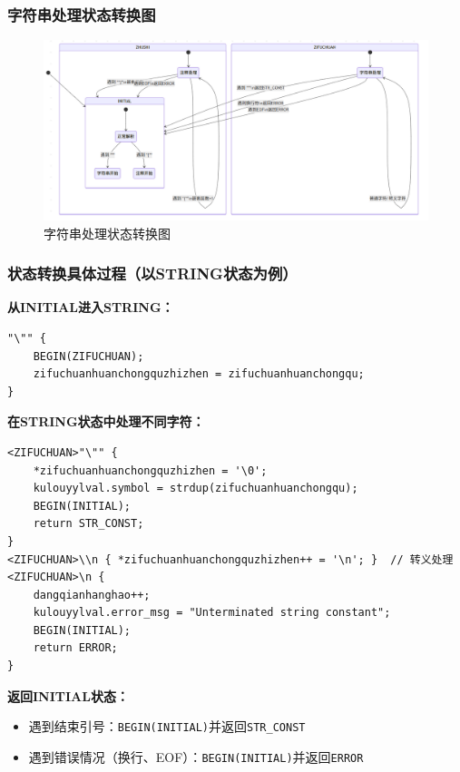 \documentclass[twocolumn]{article}
\begin{document}
\subsubsection{字符串处理状态转换图}
\begin{figure}[H]
    \centering
    \includegraphics[width=0.9\linewidth]{status_change.png}
    \caption{字符串处理状态转换图}
    \label{fig:status_change}
\end{figure}

\subsubsection{状态转换具体过程（以STRING状态为例）}

\textbf{从INITIAL进入STRING：}
\begin{lstlisting}[language=Flex, caption={进入STRING状态}, label=code:enter_string]
"\"" { 
    BEGIN(ZIFUCHUAN); 
    zifuchuanhuanchongquzhizhen = zifuchuanhuanchongqu; 
}
\end{lstlisting}

\textbf{在STRING状态中处理不同字符：}
\begin{lstlisting}[language=Flex, caption={STRING状态字符处理}, label=code:string_processing]
<ZIFUCHUAN>"\"" { 
    *zifuchuanhuanchongquzhizhen = '\0';
    kulouyylval.symbol = strdup(zifuchuanhuanchongqu);
    BEGIN(INITIAL);
    return STR_CONST;
}
<ZIFUCHUAN>\\n { *zifuchuanhuanchongquzhizhen++ = '\n'; }  // 转义处理
<ZIFUCHUAN>\n { 
    dangqianhanghao++; 
    kulouyylval.error_msg = "Unterminated string constant";
    BEGIN(INITIAL);
    return ERROR;
}
\end{lstlisting}

\textbf{返回INITIAL状态：}
\begin{itemize}
    \item 遇到结束引号：\texttt{BEGIN(INITIAL)}并返回\texttt{STR\_CONST}
    \item 遇到错误情况（换行、EOF）：\texttt{BEGIN(INITIAL)}并返回\texttt{ERROR}
\end{itemize}
\end{document}

